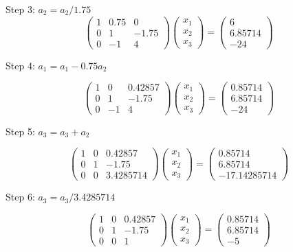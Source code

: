 \documentclass[]{article}
\begin{document}
Step 3: \(a_2 = a_2 / 1.75\) \[
\left(\begin{array}{ccc} 
1 & 0.75 & 0\\
0 & 1 & -1.75\\
0 & -1 & 4
\end{array}\right)
\left(\begin{array}{c} 
x_1 \\
x_2 \\
x_3
\end{array}\right) =
\left(\begin{array}{c}
6 \\
6.85714 \\
-24
\end{array}\right)
\]

Step 4: \(a_1 = a_1 - 0.75a_2\)

\[
\left(\begin{array}{ccc} 
1 & 0 & 0.42857\\
0 & 1 & -1.75\\
0 & -1 & 4
\end{array}\right)
\left(\begin{array}{c} 
x_1 \\
x_2 \\
x_3
\end{array}\right) =
\left(\begin{array}{c}
0.85714 \\
6.85714 \\
-24
\end{array}\right)
\]

Step 5: \(a_3 = a_3+a_2\)

\[
\left(\begin{array}{ccc} 
1 & 0 & 0.42857\\
0 & 1 & -1.75\\
0 & 0 & 3.4285714
\end{array}\right)
\left(\begin{array}{c} 
x_1 \\
x_2 \\
x_3
\end{array}\right) =
\left(\begin{array}{c}
0.85714 \\
6.85714 \\
-17.14285714
\end{array}\right)
\]

Step 6: \(a_3 = a_3 / 3.4285714\)

\[
\left(\begin{array}{ccc} 
1 & 0 & 0.42857\\
0 & 1 & -1.75\\
0 & 0 & 1
\end{array}\right)
\left(\begin{array}{c} 
x_1 \\
x_2 \\
x_3
\end{array}\right) =
\left(\begin{array}{c}
0.85714 \\
6.85714 \\
-5
\end{array}\right)
\]
\end{document}
